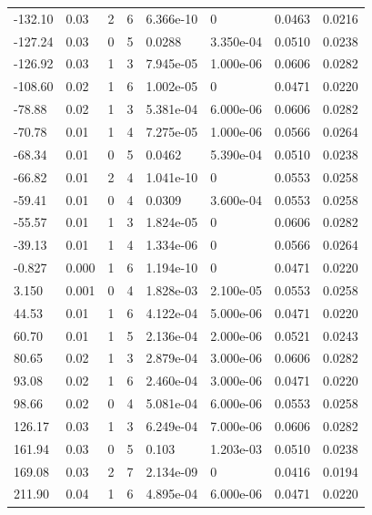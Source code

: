 \documentclass[preview]{standalone}
\begin{document}
{{\begin{tabular}{L{1.2cm}C{1.2cm} C{0.3cm}C{0.5cm} C{1.4cm}C{1.4cm} C{1.4cm}C{1.4cm}}
  -132.10  &  0.03  & 2     &  6 &  6.366e-10  & 0  & 0.0463 &  0.0216   \\ 
  -127.24  &  0.03  & 0     &  5 &  0.0288  & 3.350e-04  & 0.0510 &  0.0238   \\ 
  -126.92  &  0.03  & 1     &  3 &  7.945e-05  & 1.000e-06  & 0.0606 &  0.0282   \\ 
  -108.60  &  0.02  & 1     &  6 &  1.002e-05  & 0  & 0.0471 &  0.0220   \\ 
  -78.88  &  0.02  & 1     &  3 &  5.381e-04  & 6.000e-06  & 0.0606 &  0.0282   \\ 
  -70.78  &  0.01  & 1     &  4 &  7.275e-05  & 1.000e-06  & 0.0566 &  0.0264   \\ 
  -68.34  &  0.01  & 0     &  5 &  0.0462  & 5.390e-04  & 0.0510 &  0.0238   \\ 
  -66.82  &  0.01  & 2     &  4 &  1.041e-10  & 0  & 0.0553 &  0.0258   \\ 
  -59.41  &  0.01  & 0     &  4 &  0.0309  & 3.600e-04  & 0.0553 &  0.0258   \\ 
  -55.57  &  0.01  & 1     &  3 &  1.824e-05  & 0  & 0.0606 &  0.0282   \\ 
  -39.13  &  0.01  & 1     &  4 &  1.334e-06  & 0  & 0.0566 &  0.0264   \\ 
  -0.827  &  0.000  & 1     &  6 &  1.194e-10  & 0  & 0.0471 &  0.0220   \\ 
  3.150  &  0.001  & 0     &  4 &  1.828e-03  & 2.100e-05  & 0.0553 &  0.0258   \\ 
  44.53  &  0.01  & 1     &  6 &  4.122e-04  & 5.000e-06  & 0.0471 &  0.0220   \\ 
  60.70  &  0.01  & 1     &  5 &  2.136e-04  & 2.000e-06  & 0.0521 &  0.0243   \\ 
  80.65  &  0.02  & 1     &  3 &  2.879e-04  & 3.000e-06  & 0.0606 &  0.0282   \\ 
  93.08  &  0.02  & 1     &  6 &  2.460e-04  & 3.000e-06  & 0.0471 &  0.0220   \\ 
  98.66  &  0.02  & 0     &  4 &  5.081e-04  & 6.000e-06  & 0.0553 &  0.0258   \\ 
  126.17  &  0.03  & 1     &  3 &  6.249e-04  & 7.000e-06  & 0.0606 &  0.0282   \\ 
  161.94  &  0.03  & 0     &  5 &  0.103  & 1.203e-03  & 0.0510 &  0.0238   \\ 
  169.08  &  0.03  & 2     &  7 &  2.134e-09  & 0  & 0.0416 &  0.0194   \\ 
  211.90  &  0.04  & 1     &  6 &  4.895e-04  & 6.000e-06  & 0.0471 &  0.0220   \\ 

\end{tabular}}}
\end{document}
